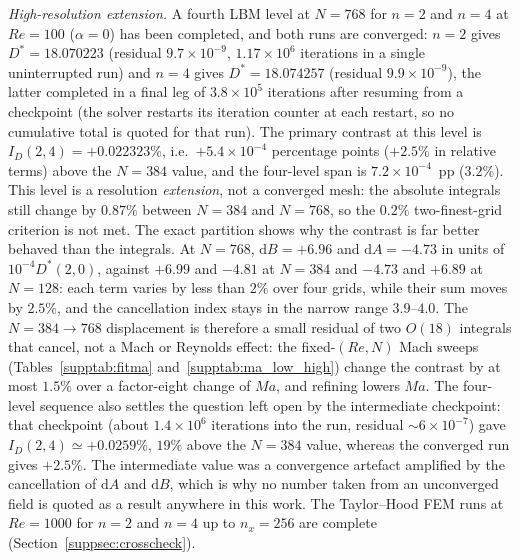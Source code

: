 \emph{High-resolution extension.} A fourth LBM level at $N=768$ for $n=2$ and $n=4$ at $Re=100$ ($\alpha=0$) has been completed, and both runs are converged: $n=2$ gives $D^*=18.070223$ (residual $9.7\times10^{-9}$, $1.17\times10^{6}$ iterations in a single uninterrupted run) and $n=4$ gives $D^*=18.074257$ (residual $9.9\times10^{-9}$), the latter completed in a final leg of $3.8\times10^{5}$ iterations after resuming from a checkpoint (the solver restarts its iteration counter at each restart, so no cumulative total is quoted for that run). The primary contrast at this level is $I_D(2,4)=+0.022323\%$, i.e.\ $+5.4\times10^{-4}$ percentage points ($+2.5\%$ in relative terms) above the $N=384$ value, and the four-level span is $7.2\times10^{-4}$~pp ($3.2\%$). This level is a resolution \emph{extension}, not a converged mesh: the absolute integrals still change by $0.87\%$ between $N=384$ and $N=768$, so the $0.2\%$ two-finest-grid criterion is not met. The exact partition shows why the contrast is far better behaved than the integrals. At $N=768$, $\mathrm{d}B=+6.96$ and $\mathrm{d}A=-4.73$ in units of $10^{-4}D^*(2,0)$, against $+6.99$ and $-4.81$ at $N=384$ and $-4.73$ and $+6.89$ at $N=128$: each term varies by less than $2\%$ over four grids, while their sum moves by $2.5\%$, and the cancellation index stays in the narrow range $3.9$--$4.0$. The $N=384\to768$ displacement is therefore a small residual of two $O(18)$ integrals that cancel, not a Mach or Reynolds effect: the fixed-$(Re,N)$ Mach sweeps (Tables~\ref{supptab:fitma} and~\ref{supptab:ma_low_high}) change the contrast by at most $1.5\%$ over a factor-eight change of $Ma$, and refining lowers $Ma$. The four-level sequence also settles the question left open by the intermediate checkpoint: that checkpoint (about $1.4\times10^{6}$ iterations into the run, residual $\sim6\times10^{-7}$) gave $I_D(2,4)\simeq+0.0259\%$, $19\%$ above the $N=384$ value, whereas the converged run gives $+2.5\%$. The intermediate value was a convergence artefact amplified by the cancellation of $\mathrm{d}A$ and $\mathrm{d}B$, which is why no number taken from an unconverged field is quoted as a result anywhere in this work. The Taylor--Hood FEM runs at $Re=1000$ for $n=2$ and $n=4$ up to $n_x=256$ are complete (Section~\ref{suppsec:crosscheck}).
